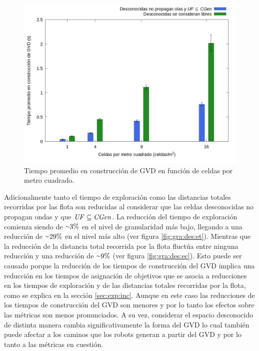 \begin{figure}[H]
  \centerfloat
  \includegraphics[clip=true, width=\graphlen]{imagenes/graficas_chicas/graficas_histo_num/desconocido/gvd_construction_time_mean.png}
  \caption{Tiempo promedio en construcción de GVD en función de celdas por metro cuadrado.}\label{fig:gra:des:gvdt}
\end{figure}


Adicionalmente tanto el tiempo de exploración como las distancias totales
recorridas por las flota son reducidas al considerar que las celdas
desconocidas no propagan ondas y que $\mathit{UF} \subseteq \mathit{CGen}$. La
reducción del tiempo de exploración comienza siendo de ${\smallsim}3\%$ en el
nivel de granularidad más bajo, llegando a una reducción de ${\smallsim}29\%$
en el nivel más alto (ver figura \ref{fig:gra:des:et}). Mientras que la reducción de la distancia total recorrida
por la flota fluctúa entre ninguna reducción y una reducción de
${\smallsim}9\%$ (ver figura \ref{fig:gra:des:ec}). Esto puede ser causado porque la reducción de los tiempos de
construcción del GVD implica una reducción en los tiempos de asignación de
objetivos que se asocia a reducciones en los tiempos de exploración y de
las distancias totales recorridas por la flota, como se explica en la sección
\ref{sec:exp:inc}. Aunque en este caso las reducciones de los tiempos de construcción del
GVD son menores y por lo tanto los efectos sobre las métricas son menos
pronunciados. A su vez, considerar el espacio desconocido de distinta manera
cambia significativamente la forma del GVD lo cual también puede afectar a los
caminos que los robots generan a partir del GVD y por lo tanto a las métricas en cuestión.

